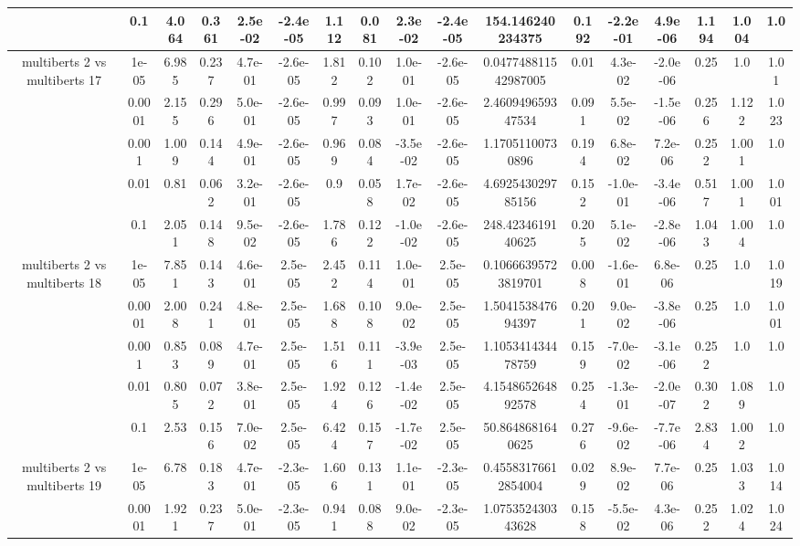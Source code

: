 \begin{tabular}{|c|c|c|c|c|c|c|c|c|c|c|c|c|c|c|c|c|}
 & 0.1 & 4.064 & 0.361 & 2.5e-02 & -2.4e-05 & 1.112 & 0.081 & 2.3e-02 & -2.4e-05 & 154.146240234375 & 0.192 & -2.2e-01 & 4.9e-06 & 1.194 & 1.004 & 1.0 \\
\hline
\multirow{5}{*}{multiberts 2 vs multiberts 17} & 1e-05 & 6.985 & 0.237 & 4.7e-01 & -2.6e-05 & 1.812 & 0.102 & 1.0e-01 & -2.6e-05 & 0.047748811542987005 & 0.01 & 4.3e-02 & -2.0e-06 & 0.25 & 1.0 & 1.01 \\
 & 0.0001 & 2.155 & 0.296 & 5.0e-01 & -2.6e-05 & 0.997 & 0.093 & 1.0e-01 & -2.6e-05 & 2.460949659347534 & 0.091 & 5.5e-02 & -1.5e-06 & 0.256 & 1.122 & 1.023 \\
 & 0.001 & 1.009 & 0.144 & 4.9e-01 & -2.6e-05 & 0.969 & 0.084 & -3.5e-02 & -2.6e-05 & 1.17051100730896 & 0.194 & 6.8e-02 & 7.2e-06 & 0.252 & 1.001 & 1.0 \\
 & 0.01 & 0.81 & 0.062 & 3.2e-01 & -2.6e-05 & 0.9 & 0.058 & 1.7e-02 & -2.6e-05 & 4.692543029785156 & 0.152 & -1.0e-01 & -3.4e-06 & 0.517 & 1.001 & 1.001 \\
 & 0.1 & 2.051 & 0.148 & 9.5e-02 & -2.6e-05 & 1.786 & 0.122 & -1.0e-02 & -2.6e-05 & 248.4234619140625 & 0.205 & 5.1e-02 & -2.8e-06 & 1.043 & 1.004 & 1.0 \\
\hline
\multirow{5}{*}{multiberts 2 vs multiberts 18} & 1e-05 & 7.851 & 0.143 & 4.6e-01 & 2.5e-05 & 2.452 & 0.114 & 1.0e-01 & 2.5e-05 & 0.10666395723819701 & 0.008 & -1.6e-01 & 6.8e-06 & 0.25 & 1.0 & 1.019 \\
 & 0.0001 & 2.008 & 0.241 & 4.8e-01 & 2.5e-05 & 1.688 & 0.108 & 9.0e-02 & 2.5e-05 & 1.504153847694397 & 0.201 & 9.0e-02 & -3.8e-06 & 0.25 & 1.0 & 1.001 \\
 & 0.001 & 0.853 & 0.089 & 4.7e-01 & 2.5e-05 & 1.516 & 0.111 & -3.9e-03 & 2.5e-05 & 1.105341434478759 & 0.159 & -7.0e-02 & -3.1e-06 & 0.252 & 1.0 & 1.0 \\
 & 0.01 & 0.805 & 0.072 & 3.8e-01 & 2.5e-05 & 1.924 & 0.126 & -1.4e-02 & 2.5e-05 & 4.154865264892578 & 0.254 & -1.3e-01 & -2.0e-07 & 0.302 & 1.089 & 1.0 \\
 & 0.1 & 2.53 & 0.156 & 7.0e-02 & 2.5e-05 & 6.424 & 0.157 & -1.7e-02 & 2.5e-05 & 50.8648681640625 & 0.276 & -9.6e-02 & -7.7e-06 & 2.834 & 1.002 & 1.0 \\
\hline
\multirow{5}{*}{multiberts 2 vs multiberts 19} & 1e-05 & 6.78 & 0.183 & 4.7e-01 & -2.3e-05 & 1.606 & 0.131 & 1.1e-01 & -2.3e-05 & 0.45583176612854004 & 0.029 & 8.9e-02 & 7.7e-06 & 0.25 & 1.033 & 1.014 \\
 & 0.0001 & 1.921 & 0.237 & 5.0e-01 & -2.3e-05 & 0.941 & 0.088 & 9.0e-02 & -2.3e-05 & 1.075352430343628 & 0.158 & -5.5e-02 & 4.3e-06 & 0.252 & 1.024 & 1.024 \\

\end{tabular}
